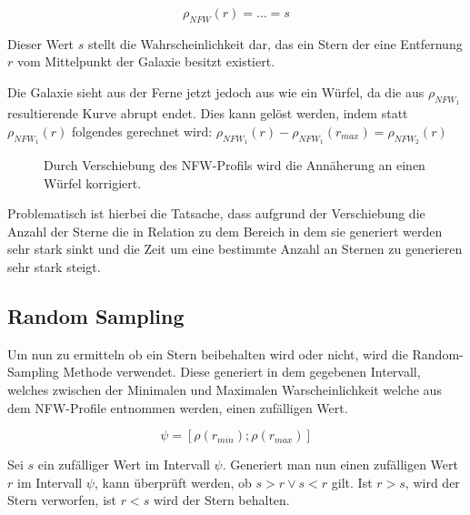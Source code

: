 \begin{equation}
\rho_{NFW}(r) = \dots = s
\end{equation}

Dieser Wert \( s \) stellt die Wahrscheinlichkeit dar, das ein Stern der
eine Entfernung \( r \) vom Mittelpunkt der Galaxie besitzt existiert.

Die Galaxie sieht aus der Ferne jetzt jedoch aus wie ein Würfel, da die aus \(
\rho_{NFW_{1}} \) resultierende Kurve abrupt endet. Dies kann gelöst werden,
indem statt \( \rho_{NFW_{1}}(r) \) folgendes gerechnet wird: \(
\rho_{NFW_{1}}(r) - \rho_{NFW_{1}}(r_{max}) = \rho_{NFW_{2}}(r)\)

\begin{figure}
\centering
{}
\caption{Durch Verschiebung des NFW-Profils wird die Annäherung an einen Würfel korrigiert.}
\end{figure}

Problematisch ist hierbei die Tatsache, dass aufgrund der Verschiebung die
Anzahl der Sterne die in Relation zu dem Bereich in dem sie generiert werden
sehr stark sinkt und die Zeit um eine bestimmte Anzahl an Sternen zu generieren
sehr stark steigt.

\subsection{Random Sampling} \label{subsec:random_sampling}

Um nun zu ermitteln ob ein Stern beibehalten wird oder nicht, wird die
Random-Sampling Methode verwendet.  Diese generiert in dem gegebenen Intervall,
welches zwischen der Minimalen und Maximalen Warscheinlichkeit welche aus dem
NFW-Profile entnommen werden, einen zufälligen Wert.

\begin{equation}\label{range:psi}
    \psi = [ \rho(r_{min}); \rho(r_{max}) ] 
\end{equation}

Sei \( s \) ein zufälliger Wert im Intervall \( \psi \).  Generiert man nun
einen zufälligen Wert \( r \) im Intervall \( \psi \), kann überprüft werden, ob \( s
> r \lor s < r \) gilt. Ist \( r
> s \), wird der Stern verworfen, ist \( r < s \) wird der Stern behalten.

